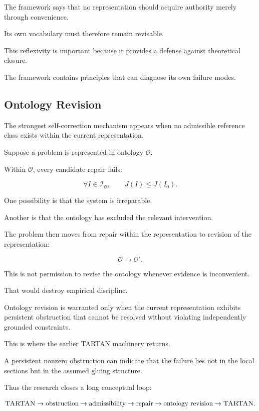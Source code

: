 \documentclass[11pt]{article}
\theoremstyle{remark}
\newcommand{\TARTAN}{\textsc{TARTAN}}
\begin{document}
The framework says that no representation should acquire authority merely through convenience.

Its own vocabulary must therefore remain revisable.

This reflexivity is important because it provides a defense against theoretical closure.

The framework contains principles that can diagnose its own failure modes.

\subsection{Ontology Revision}

The strongest self-correction mechanism appears when no admissible reference class exists within the current representation.

Suppose a problem is represented in ontology $\mathcal{O}$.

Within $\mathcal{O}$, every candidate repair fails:

\begin{equation}
\forall I\in\mathcal{I}_{\mathcal{O}},
\qquad
J(I)\leq J(I_0).
\end{equation}

One possibility is that the system is irreparable.

Another is that the ontology has excluded the relevant intervention.

The problem then moves from repair within the representation to revision of the representation:

\begin{equation}
\mathcal{O}
\longrightarrow
\mathcal{O}'.
\end{equation}

This is not permission to revise the ontology whenever evidence is inconvenient.

That would destroy empirical discipline.

Ontology revision is warranted only when the current representation exhibits persistent obstruction that cannot be resolved without violating independently grounded constraints.

This is where the earlier \TARTAN{} machinery returns.

A persistent nonzero obstruction can indicate that the failure lies not in the local sections but in the assumed gluing structure.

Thus the research closes a long conceptual loop:

\begin{equation}
\TARTAN
\rightarrow
\text{obstruction}
\rightarrow
\text{admissibility}
\rightarrow
\text{repair}
\rightarrow
\text{ontology revision}
\rightarrow
\TARTAN.
\end{equation}
\end{document}
